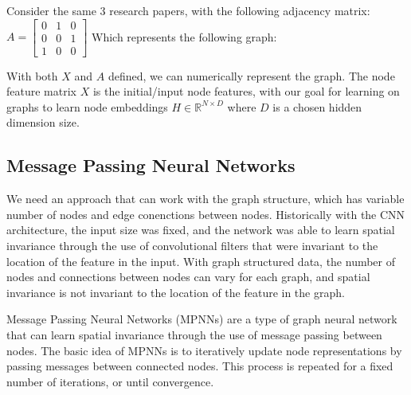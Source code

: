 \documentclass[../main.tex]{subfiles}
\begin{document}
  Consider the same 3 research papers, with the following adjacency matrix:
  $A = \begin{bmatrix}
  0 & 1 & 0 \\
  0 & 0 & 1 \\
  1 & 0 & 0
  \end{bmatrix}$
  Which represents the following graph:

  \begin{center}
    \end{center}

    With both $X$ and $A$ defined, we can numerically represent the graph. The node feature matrix $X$ is the initial/input node features, with our goal for learning on graphs to learn node embeddings $H \in \mathbb{R}^{N\times D}$ where $D$ is a chosen hidden dimension size. 


    \subsection{Message Passing Neural Networks}

    We need an approach that can work with the graph structure, which has variable number of nodes and edge conenctions between nodes. Historically with the CNN architecture, the input size was fixed, and the network was able to learn spatial invariance through the use of convolutional filters that were invariant to the location of the feature in the input. With graph structured data, the number of nodes and connections between nodes can vary for each graph, and spatial invariance is not invariant to the location of the feature in the graph. 

    Message Passing Neural Networks (MPNNs) are a type of graph neural network that can learn spatial invariance through the use of message passing between nodes. The basic idea of MPNNs is to iteratively update node representations by passing messages between connected nodes. This process is repeated for a fixed number of iterations, or until convergence.
\end{document}
